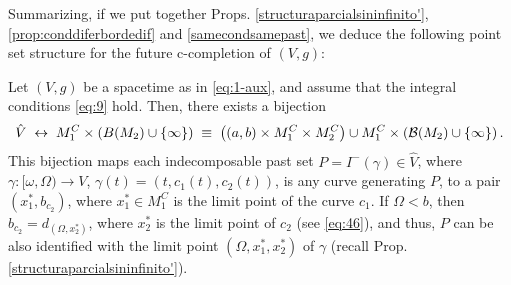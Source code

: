 \noindent Summarizing, if we put together Props. \ref{structuraparcialsininfinito'}, \ref{prop:conddiferbordedif}
and \ref{samecondsamepast}, we deduce the following point set structure for the future c-completion of $(V,g)$:
\begin{thm}\label{futurecomploneinfinite}
  Let $(V,g)$ be a  {\multiwarped} spacetime as in \eqref{eq:1-aux}, and assume that the integral conditions \eqref{eq:9} hold. Then, there exists a bijection
 \begin{equation}
   \label{eq:10}
     \hat{V}\; \leftrightarrow \;  M_1^C\times \left(B(M_2)\cup \{\infty\}\right)\;\equiv\;
       \left( (a,b)\times M_1^C\times M_2^C\right) \cup M_{1}^{C} \times \left({\cal B}(M_2)\cup \{\infty\}\right).
%
  \end{equation}
 This bijection maps each indecomposable past set $P=I^-(\gamma)\in \hat{V}$, where $\gamma:[\omega,\Omega)\rightarrow V$, $\gamma(t)=(t,c_1(t),c_2(t))$, is any curve generating $P$, to a pair $(x_1^*,b_{c_2})$, where $x_1^*\in M_1^C$ is the limit point of the curve $c_1$. If $\Omega<b$, then $b_{c_2}=d_{(\Omega,x_2^*)}$, where $x_2^*$ is the limit point of $c_2$ (see \eqref{eq:46}), and thus, $P$ can be also identified with the limit point $(\Omega,x_1^*,x_2^*)$ of $\gamma$ (recall Prop. \ref{structuraparcialsininfinito'}).

\end{thm}




